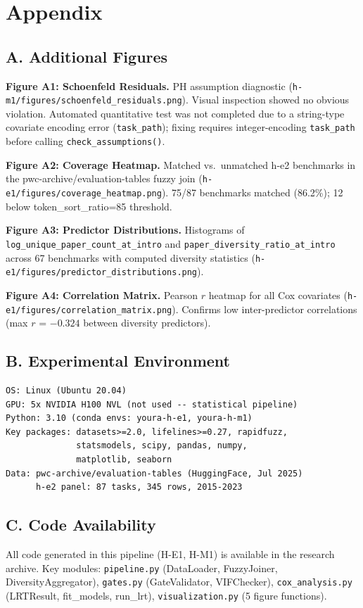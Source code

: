 \section*{Appendix}

\subsection*{A. Additional Figures}

\textbf{Figure A1: Schoenfeld Residuals.} PH assumption diagnostic (\texttt{h-m1/figures/schoenfeld\_residuals.png}). Visual inspection showed no obvious violation. Automated quantitative test was not completed due to a string-type covariate encoding error (\texttt{task\_path}); fixing requires integer-encoding \texttt{task\_path} before calling \texttt{check\_assumptions()}.

\textbf{Figure A2: Coverage Heatmap.} Matched vs.\ unmatched h-e2 benchmarks in the pwc-archive/evaluation-tables fuzzy join (\texttt{h-e1/figures/coverage\_heatmap.png}). 75/87 benchmarks matched (86.2\%); 12 below token\_sort\_ratio=85 threshold.

\textbf{Figure A3: Predictor Distributions.} Histograms of \texttt{log\_unique\_paper\_count\_at\_intro} and \texttt{paper\_diversity\_ratio\_at\_intro} across 67 benchmarks with computed diversity statistics (\texttt{h-e1/figures/predictor\_distributions.png}).

\textbf{Figure A4: Correlation Matrix.} Pearson $r$ heatmap for all Cox covariates (\texttt{h-e1/figures/correlation\_matrix.png}). Confirms low inter-predictor correlations (max $r$ = $-0.324$ between diversity predictors).

\subsection*{B. Experimental Environment}

\begin{verbatim}
OS: Linux (Ubuntu 20.04)
GPU: 5x NVIDIA H100 NVL (not used -- statistical pipeline)
Python: 3.10 (conda envs: youra-h-e1, youra-h-m1)
Key packages: datasets>=2.0, lifelines>=0.27, rapidfuzz,
              statsmodels, scipy, pandas, numpy,
              matplotlib, seaborn
Data: pwc-archive/evaluation-tables (HuggingFace, Jul 2025)
      h-e2 panel: 87 tasks, 345 rows, 2015-2023
\end{verbatim}

\subsection*{C. Code Availability}

All code generated in this pipeline (H-E1, H-M1) is available in the research archive. Key modules: \texttt{pipeline.py} (DataLoader, FuzzyJoiner, DiversityAggregator), \texttt{gates.py} (GateValidator, VIFChecker), \texttt{cox\_analysis.py} (LRTResult, fit\_models, run\_lrt), \texttt{visualization.py} (5 figure functions).
